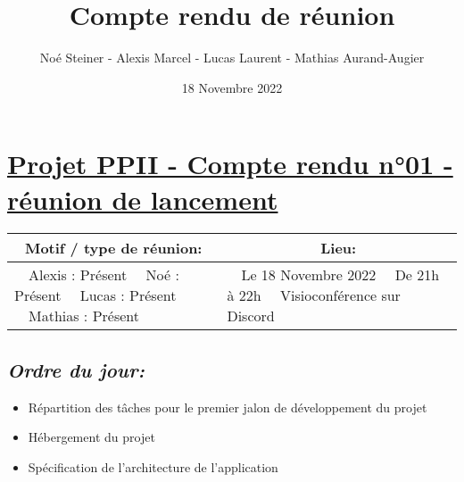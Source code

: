 \documentclass[french,a4paper]{article}
\author{Noé Steiner - Alexis Marcel - Lucas Laurent - Mathias Aurand-Augier}
\date{18 Novembre 2022}
\newcommand{\tabitem}{\textbullet~~}\title{Compte rendu de réunion}
\begin{document}
\maketitle

\section*{\underline{Projet PPII - Compte rendu n°01 - réunion de lancement}}

\begin{table}[!htb]
  \centering
  \begin{tabular}{| p{7cm} | p{7cm} |}
    \hline
    \multicolumn{1}{|c|}{ Motif / type de réunion:} & \multicolumn{1}{c|}{Lieu:} \\
    \hline
    \tabitem Alexis : Présent\newline
    \tabitem Noé : Présent\newline
    \tabitem Lucas : Présent\newline
    \tabitem Mathias : Présent                      &
    \tabitem Le 18 Novembre 2022\newline
    \tabitem De 21h à 22h\newline
    \tabitem Visioconférence sur Discord                                         \\
    \hline
  \end{tabular}
\end{table}

\subsection*{\textit{Ordre du jour:}}

\begin{itemize}
  \item Répartition des tâches pour le premier jalon de développement du projet
  \item Hébergement du projet
  \item Spécification de l'architecture de l'application
\end{itemize}
\end{document}
